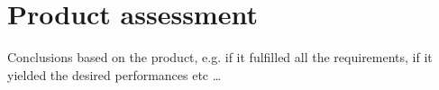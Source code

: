 \section{Product assessment}\label{sec:concl_prod}

Conclusions based on the product, e.g. if it fulfilled all the requirements, if it yielded the desired performances etc \dots
